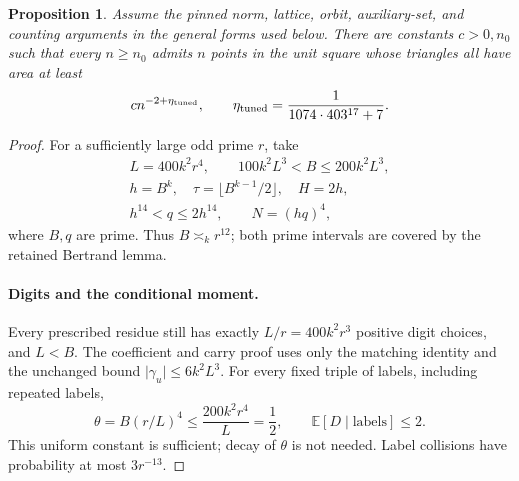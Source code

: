 \documentclass[11pt]{article}
\newtheorem{proposition}[lemma]{Proposition}
\begin{document}
\begin{proposition}\label{prop:tuned}
Assume the pinned norm, lattice, orbit, auxiliary-set, and counting
arguments in the general forms used below. There are constants \(c>0,n_0\)
such that every \(n\ge n_0\) admits \(n\) points in the unit square
whose triangles all have area at least
\[
 c n^{-2+\eta_{\rm tuned}},\qquad
 \eta_{\rm tuned}=\frac{1}{1074\cdot403^{17}+7}.
\]
\end{proposition}
\begin{proof}
For a sufficiently large odd prime \(r\), take
\[
\begin{gathered}
 L=400k^2r^4,\qquad100k^2L^3<B\le200k^2L^3,\\
 h=B^k,\quad\tau=\lfloor B^{k-1}/2\rfloor,\quad H=2h,\\
 h^{14}<q\le2h^{14},\qquad N=(hq)^4 ,
\end{gathered}
\]
where \(B,q\) are prime. Thus \(B\asymp_k r^{12}\);
both prime intervals are covered by the retained Bertrand lemma.

\paragraph{Digits and the conditional moment.}
Every prescribed residue still has exactly \(L/r=400k^2r^3\)
positive digit choices, and \(L<B\). The coefficient and carry proof
uses only the matching identity and the unchanged bound
\(\lvert\gamma_u\rvert\le6k^2L^3\).
For every fixed triple of labels, including repeated labels,
\[
 \theta=B(r/L)^4\le\frac{200k^2r^4}{L}=\frac12,\qquad
 {\mathbb E}[D\mid\text{labels}]\le2.
\]
This uniform constant is sufficient; decay of \(\theta\) is not needed.
Label collisions have probability at most \(3r^{-13}\).


\end{proof}
\end{document}
